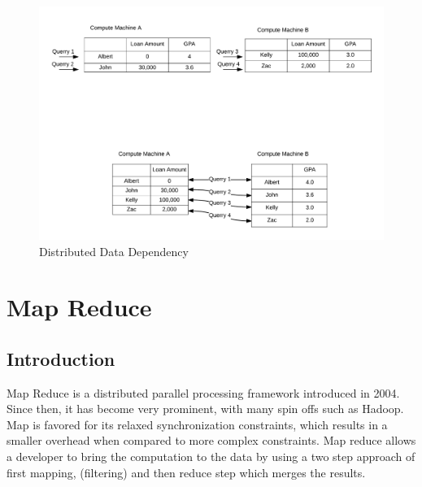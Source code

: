 \documentclass[10pt,twocolumn]{IEEEtran11}
\begin{document}
\begin{figure}[h]
\centering
\includegraphics[scale=0.12]{images/parallelComputation.png}
\caption{Distributed Data Dependency}
\label{fig:distDataDependency}
\end{figure}








\section{Map Reduce}
\subsection{Introduction}
Map Reduce is a distributed parallel processing framework introduced in 2004\cite{dean2001mapreduce}.  Since then, it has become very prominent, with many spin offs such as Hadoop.  Map is favored for its relaxed synchronization constraints, which results in a smaller overhead when compared to more complex constraints.  Map reduce allows a developer to bring the computation to the data by using a two step approach of first mapping, (filtering) and then reduce step which merges the results.
\end{document}
